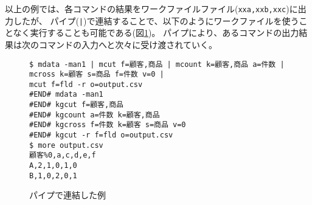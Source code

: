 

以上の例では、各コマンドの結果をワークファイルファイル(\verb|xxa,xxb,xxc|)に出力したが、
パイプ(\verb/|/)で連結することで、以下のようにワークファイルを使うことなく実行することも可能である(図\ref{fig:abstract2-1_1})。
パイプにより、あるコマンドの出力結果は次のコマンドの入力へと次々に受け渡されていく。

%
\begin{figure}[htbp]
\begin{Verbatim}[baselinestretch=0.7,frame=single]
$ mdata -man1 | mcut f=顧客,商品 | mcount k=顧客,商品 a=件数 | mcross k=顧客 s=商品 f=件数 v=0 |
mcut f=fld -r o=output.csv
#END# mdata -man1
#END# kgcut f=顧客,商品
#END# kgcount a=件数 k=顧客,商品
#END# kgcross f=件数 k=顧客 s=商品 v=0
#END# kgcut -r f=fld o=output.csv
$ more output.csv
顧客%0,a,c,d,e,f
A,2,1,0,1,0
B,1,0,2,0,1
\end{Verbatim}
\caption{パイプで連結した例\label{fig:abstract2-1_1}}
\end{figure}

%
